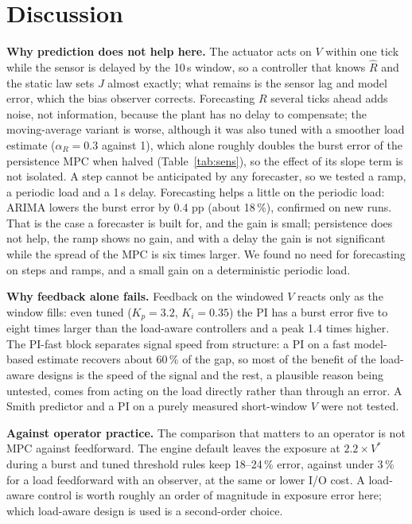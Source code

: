 \documentclass[journal]{IEEEtran}
\begin{document}
\section{Discussion}\label{sec:discussion}
\textbf{Why prediction does not help here.} The actuator acts on $V$ within one tick while the sensor is delayed by the 10\,s window, so a controller that knows $\hat R$ and the static law sets $J$ almost exactly; what remains is the sensor lag and model error, which the bias observer corrects. Forecasting $R$ several ticks ahead adds noise, not information, because the plant has no delay to compensate; the moving-average variant is worse, although it was also tuned with a smoother load estimate ($\alpha_R=0.3$ against 1), which alone roughly doubles the burst error of the persistence MPC when halved (Table~\ref{tab:sens}), so the effect of its slope term is not isolated. A step cannot be anticipated by any forecaster, so we tested a ramp, a periodic load and a 1\,s delay. Forecasting helps a little on the periodic load: ARIMA lowers the burst error by 0.4 pp (about 18\,\%), confirmed on new runs. That is the case a forecaster is built for, and the gain is small; persistence does not help, the ramp shows no gain, and with a delay the gain is not significant while the spread of the MPC is six times larger. We found no need for forecasting on steps and ramps, and a small gain on a deterministic periodic load.

\textbf{Why feedback alone fails.} Feedback on the windowed $V$ reacts only as the window fills: even tuned ($K_p=3.2$, $K_i=0.35$) the PI has a burst error five to eight times larger than the load-aware controllers and a peak 1.4 times higher. The PI-fast block separates signal speed from structure: a PI on a fast model-based estimate recovers about 60\,\% of the gap, so most of the benefit of the load-aware designs is the speed of the signal and the rest, a plausible reason being untested, comes from acting on the load directly rather than through an error. A Smith predictor and a PI on a purely measured short-window $V$ were not tested.

\textbf{Against operator practice.} The comparison that matters to an operator is not MPC against feedforward. The engine default leaves the exposure at $2.2\times V^*$ during a burst and tuned threshold rules keep 18--24\,\% error, against under 3\,\% for a load feedforward with an observer, at the same or lower I/O cost. A load-aware control is worth roughly an order of magnitude in exposure error here; which load-aware design is used is a second-order choice.
\end{document}
